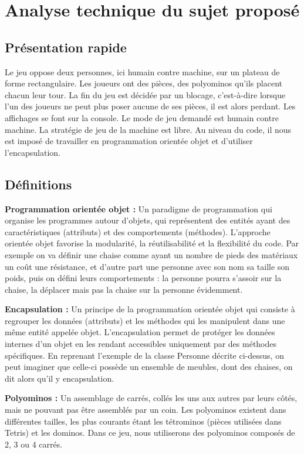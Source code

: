 \chapter{Analyse technique du sujet proposé}

\section{Présentation rapide}

Le jeu oppose deux personnes, ici humain contre machine, sur un plateau de forme rectangulaire. Les joueurs ont des pièces, des polyominos qu'ils placent chacun leur tour. La fin du jeu est décidée par un blocage, c'est-à-dire lorsque l'un des joueurs ne peut plus poser aucune de ses pièces, il est alors perdant. Les affichages se font sur la console. Le mode de jeu demandé est humain contre machine. La stratégie de jeu de la machine est libre. Au niveau du code, il nous est imposé de travailler en programmation orientée objet et d'utiliser l'encapsulation.

\newpage
\section{Définitions}

\textbf{Programmation orientée objet :} Un paradigme de programmation qui organise les programmes autour d'objets, qui représentent des entités ayant des caractéristiques (attributs) et des comportements (méthodes). L'approche orientée objet favorise la modularité, la réutilisabilité et la flexibilité du code. Par exemple on va définir une chaise comme ayant un nombre de pieds des matériaux un coût une résistance, et d'autre part une personne avec son nom sa taille son poids, puis on défini leurs comportements : la personne pourra s'assoir sur la chaise, la déplacer mais pas la chaise sur la personne évidemment.

\textbf{Encapsulation :} Un principe de la programmation orientée objet qui consiste à regrouper les données (attributs) et les méthodes qui les manipulent dans une même entité appelée objet. L'encapsulation permet de protéger les données internes d'un objet en les rendant accessibles uniquement par des méthodes spécifiques. En reprenant l'exemple de la classe Personne décrite ci-dessus, on peut imaginer que celle-ci possède un ensemble de meubles, dont des chaises, on dit alors qu'il y encapsulation.

\textbf{Polyominos :} Un assemblage de carrés, collés les uns aux autres par leurs côtés, mais ne pouvant pas être assemblés par un coin. Les polyominos existent dans différentes tailles, les plus courants étant les tétrominos (pièces utilisées dans Tetris) et les dominos. Dans ce jeu, nous utiliserons des polyominos composés de 2, 3 ou 4 carrés.

